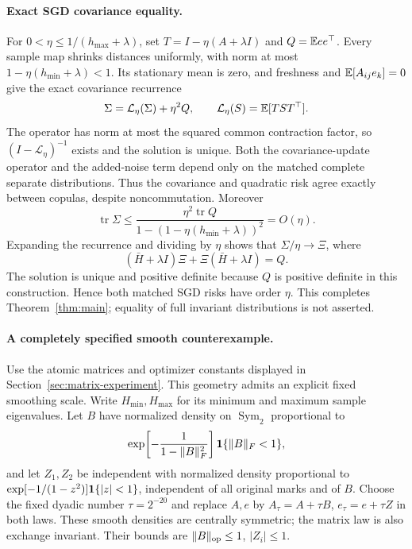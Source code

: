 \paragraph{Exact SGD covariance equality.}
For $0<\eta\leq1/(h_{\max}+\lambda)$, set
$T=I-\eta(A+\lambda I)$ and $Q=\mathbb E ee^\top$. Every sample map shrinks distances uniformly, with norm at most $1-\eta(h_{\min}+\lambda)<1$.
Its stationary mean is zero, and freshness and $\mathbb E[A_{ij}e_k]=0$ give
the exact covariance recurrence
\[
 \Sigma=\mathcal L_\eta(\Sigma)+\eta^2Q,
 \qquad \mathcal L_\eta(S)=\mathbb E[TST^\top].
\]
The operator has norm at most the squared common contraction factor, so
$(I-\mathcal L_\eta)^{-1}$ exists and the solution is unique. Both the covariance-update operator
and the added-noise term depend only on the matched complete separate
distributions. Thus the covariance
and quadratic risk agree exactly between copulas, despite noncommutation.
Moreover
\[
 \operatorname{tr}\Sigma\leq
 \frac{\eta^2\operatorname{tr}Q}
 {1-(1-\eta(h_{\min}+\lambda))^2}=O(\eta).
\]
Expanding the recurrence and dividing by $\eta$ shows that
$\Sigma/\eta\to\Xi$, where
\[
 (\bar H+\lambda I)\Xi+\Xi(\bar H+\lambda I)=Q.
\]
The solution is unique and positive definite because $Q$ is positive
definite in this construction. Hence both matched SGD risks have order
$\eta$. This completes Theorem~\ref{thm:main}; equality of full invariant
distributions is not asserted.

\paragraph{A completely specified smooth counterexample.}
Use the atomic matrices and optimizer constants displayed in
Section~\ref{sec:matrix-experiment}. This geometry admits an explicit fixed
smoothing scale.
Write $H_{\min},H_{\max}$ for its minimum and maximum sample eigenvalues.
Let $B$ have normalized density on $\operatorname{Sym}_2$ proportional to
\[
 \exp\!\left[-\frac1{1-\|B\|_F^2}\right]
                         \mathbf1\{\|B\|_F<1\},
\]
and let $Z_1,Z_2$ be independent with normalized density proportional to
$\exp[-1/(1-z^2)]\mathbf1\{|z|<1\}$, independent of all original marks and
of $B$. Choose the fixed dyadic number $\tau=2^{-20}$ and replace
$A,e$ by $A_\tau=A+\tau B$, $e_\tau=e+\tau Z$ in both laws.
These smooth densities are centrally symmetric; the matrix law is also
exchange invariant. Their bounds are $\|B\|_{\rm op}\leq1$, $|Z_i|\leq1$.

